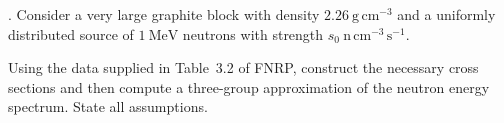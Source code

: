 
. Consider a very large graphite block with density
$2.26~\mathrm{g\,cm^{-3}}$ and a uniformly distributed source of
$1~\mathrm{MeV}$ neutrons with strength
$s_0~\mathrm{n\,cm^{-3}\,s^{-1}}$.

Using the data supplied in Table~3.2 of FNRP, construct the necessary cross
sections and then compute a three-group approximation of the neutron energy
spectrum.  State all assumptions.

